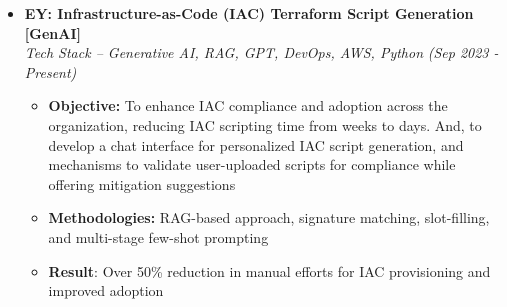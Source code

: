 \documentclass[a4paper,10pt]{article}
\newcommand{\isep}{-2 pt}
\begin{document}
\begin{itemize}
\item \textbf{EY: Infrastructure-as-Code (IAC) Terraform Script Generation [GenAI]}  \\
    \emph{Tech Stack -- Generative AI, RAG, GPT, DevOps, AWS, Python} \hfill {\emph{(Sep 2023 - Present)}}
    \\[-0.6cm]
    \begin{itemize}\itemsep \isep
    \item \textbf{Objective:} To enhance IAC compliance and adoption across the organization, reducing IAC scripting time from weeks to days. And, to develop a chat interface for personalized IAC script generation, and mechanisms to validate user-uploaded scripts for compliance while offering mitigation suggestions

    \item \textbf{Methodologies: }  RAG-based approach, signature matching, slot-filling, and multi-stage few-shot prompting
    \item \textbf{Result}: Over 50\% reduction in manual efforts for IAC provisioning and improved adoption



\end{itemize}
\end{itemize}
\end{document}
